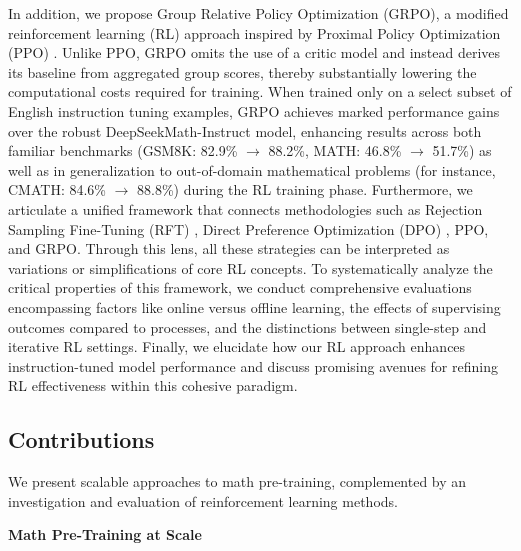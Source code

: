 In addition, we propose Group Relative Policy Optimization (GRPO), a modified reinforcement learning (RL) approach inspired by Proximal Policy Optimization (PPO) \citep{schulman2017proximal}. Unlike PPO, GRPO omits the use of a critic model and instead derives its baseline from aggregated group scores, thereby substantially lowering the computational costs required for training. When trained only on a select subset of English instruction tuning examples, GRPO achieves marked performance gains over the robust DeepSeekMath-Instruct model, enhancing results across both familiar benchmarks (GSM8K: 82.9\% $\rightarrow$ 88.2\%, MATH: 46.8\% $\rightarrow$ 51.7\%) as well as in generalization to out-of-domain mathematical problems (for instance, CMATH: 84.6\% $\rightarrow$ 88.8\%) during the RL training phase. Furthermore, we articulate a unified framework that connects methodologies such as Rejection Sampling Fine-Tuning (RFT) \citep{yuan2023scaling}, Direct Preference Optimization (DPO) \citep{dpo}, PPO, and GRPO. Through this lens, all these strategies can be interpreted as variations or simplifications of core RL concepts. To systematically analyze the critical properties of this framework, we conduct comprehensive evaluations encompassing factors like online versus offline learning, the effects of supervising outcomes compared to processes, and the distinctions between single-step and iterative RL settings. Finally, we elucidate how our RL approach enhances instruction-tuned model performance and discuss promising avenues for refining RL effectiveness within this cohesive paradigm.

\subsection{Contributions}
We present scalable approaches to math pre-training, complemented by an investigation and evaluation of reinforcement learning methods.

\textbf{Math Pre-Training at Scale}

